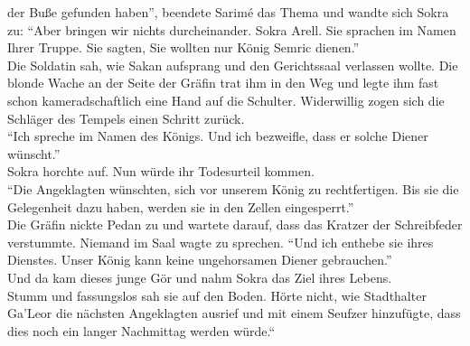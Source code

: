 der Buße gefunden haben'', beendete Sarimé das Thema und wandte sich Sokra zu: ``Aber bringen wir 
nichts durcheinander. Sokra Arell. Sie sprachen im Namen Ihrer Truppe. Sie sagten, Sie wollten nur 
König Semric dienen.''\\
Die Soldatin sah, wie Sakan aufsprang und den Gerichtssaal verlassen wollte. Die blonde Wache an der 
Seite der Gräfin trat ihm in den Weg und legte ihm fast schon kameradschaftlich eine Hand auf die 
Schulter. Widerwillig zogen sich die Schläger des Tempels einen Schritt zurück.\\
``Ich spreche im Namen des Königs. Und ich bezweifle, dass er solche Diener wünscht.''\\
Sokra horchte auf. Nun würde ihr Todesurteil kommen.\\
``Die Angeklagten wünschten, sich vor unserem König zu rechtfertigen. Bis sie die Gelegenheit 
dazu haben, werden sie in den Zellen eingesperrt.''\\
Die Gräfin nickte Pedan zu und wartete darauf, dass das Kratzer der Schreibfeder verstummte. 
Niemand im Saal wagte zu sprechen. ``Und ich enthebe sie ihres Dienstes. Unser König kann keine 
ungehorsamen Diener gebrauchen.''\\
Und da kam dieses junge Gör und nahm Sokra das Ziel ihres Lebens.\\
Stumm und fassungslos sah sie auf den Boden. Hörte nicht, wie Stadthalter Ga'Leor die nächsten 
Angeklagten ausrief und mit einem Seufzer hinzufügte, dass dies noch ein langer Nachmittag werden 
würde.``\\
